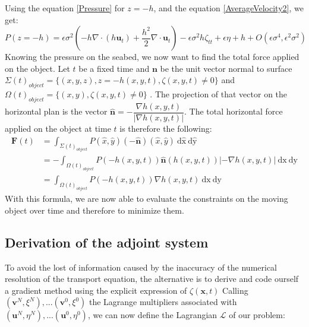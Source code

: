 \documentclass[11pt,a4paper]{article}
\begin{document}
	Using the equation \eqref{Pressure} for $ z = -h$, and the equation \eqref{AverageVelocity2}, we get:
	\begin{equation}
		P(z=-h) = \epsilon \sigma^2(-h\nabla \cdot (h \mathbf{u}_t) + \frac{h^2}{2} \nabla \cdot \mathbf{u}_t) - \epsilon \sigma^2 h \zeta_{tt} + \epsilon \eta + h + O(\epsilon\sigma^4, \epsilon^2 \sigma^2)
	\end{equation}	
	Knowing the pressure on the seabed, we now want to find the total force applied on the object.	Let $t$ be a fixed time and $\mathbf{n}$ be the unit vector normal to surface $\Sigma(t)_{object} = \{(x,y,z), z = - h(x,y,t), \zeta(x,y,t)\neq 0 \} $ and $\Omega(t)_{object} = \{(x,y), \zeta(x,y,t)\neq 0 \} $ . The projection of that vector on the horizontal plan is the vector $\hat{\mathbf{n}} = - \dfrac{\nabla h(x,y,t)}{|\nabla h(x,y,t)|}$. The total horizontal force applied on the object at time $t$ is therefore the following: 
	\begin{align*}
		\mathbf{F}(t) &= \int_{\Sigma(t)_{object}}{\! P(\hat{x}, \hat{y}) (-\hat{\mathbf{n}})(\hat{x},\hat{y}) \: \mathrm{d\hat{x}}\:\mathrm{d\hat{y}}}\\
		 & = - \int_{\Omega(t)_{object}}{\! P(-h(x,y,t)) \hat{\mathbf{n}}(h(x,y,t)) |-\nabla h(x,y,t)| \: \mathrm{dx}\:\mathrm{dy}}\\
		 & = \int_{\Omega(t)_{object}}{\! P(-h(x,y,t)) \nabla h(x,y,t) \: \mathrm{dx}\:\mathrm{dy}}
	\end{align*}	
	With this formula, we are now able to evaluate the constraints on the moving object over time and therefore to minimize them. 					

\subsection{Derivation of the adjoint system}
	To avoid the lost of information caused by the inaccuracy of the numerical resolution of the transport equation, the alternative is to derive and code ourself a gradient method using the explicit expression of $\zeta(\mathbf{x},t)$
	Calling $(\mathbf{v}^N, \xi^N), ... (\mathbf{v}^0, \xi^0)$ the Lagrange multipliers associated with $(\mathbf{u}^N, \eta^N), ... (\mathbf{u}^0, \eta^0)$, we can now define the Lagrangian $\mathcal{L} $ of our problem: 
		
\end{document}

